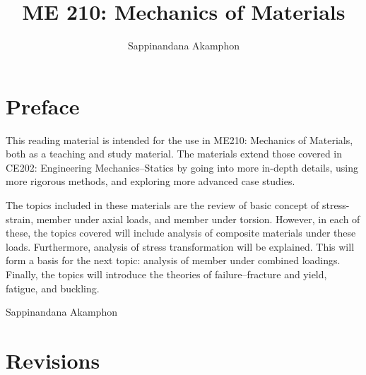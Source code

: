 \documentclass[
fontsize=10pt,
a4paper,
twosides=false,
open=any,
svgnames,
]{kaobook} %
\author{Sappinandana Akamphon}
\title{ME 210: Mechanics of Materials}
\begin{document}
\frontmatter

\restoregeometry %
\nopagecolor%

\chapter*{Preface}

This reading material is intended for the use in ME210: Mechanics of Materials, both as a teaching and study material. The materials extend those covered in CE202: Engineering Mechanics--Statics by going into more in-depth details, using more rigorous methods, and exploring more advanced case studies.

The topics included in these materials are the review of basic concept of stress-strain, member under axial loads, and member under torsion. However, in each of these, the topics covered will include analysis of composite materials under these loads. Furthermore, analysis of stress transformation will be explained. This will form a basis for the next topic: analysis of member under combined loadings. Finally, the topics will introduce the theories of failure--fracture and yield, fatigue, and buckling.

\vspace{3cm} \hspace{9cm}
Sappinandana Akamphon

\chapter*{Revisions}
\end{document}
